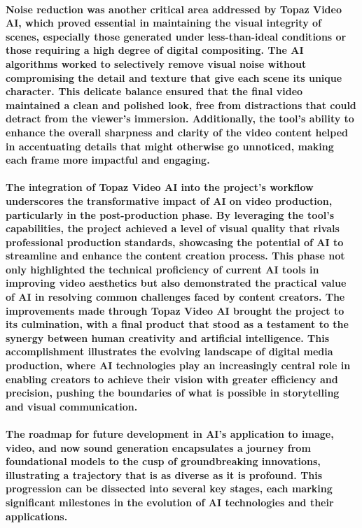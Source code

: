 \documentclass[11pt,a4paper,oneside]{report}
\begin{document}
\paragraph{Noise reduction was another critical area addressed by Topaz Video AI, which proved essential in maintaining the visual integrity of scenes, especially those generated under less-than-ideal conditions or those requiring a high degree of digital compositing. The AI algorithms worked to selectively remove visual noise without compromising the detail and texture that give each scene its unique character. This delicate balance ensured that the final video maintained a clean and polished look, free from distractions that could detract from the viewer's immersion. Additionally, the tool's ability to enhance the overall sharpness and clarity of the video content helped in accentuating details that might otherwise go unnoticed, making each frame more impactful and engaging.}

\paragraph{The integration of Topaz Video AI into the project's workflow underscores the transformative impact of AI on video production, particularly in the post-production phase. By leveraging the tool's capabilities, the project achieved a level of visual quality that rivals professional production standards, showcasing the potential of AI to streamline and enhance the content creation process. This phase not only highlighted the technical proficiency of current AI tools in improving video aesthetics but also demonstrated the practical value of AI in resolving common challenges faced by content creators. The improvements made through Topaz Video AI brought the project to its culmination, with a final product that stood as a testament to the synergy between human creativity and artificial intelligence. This accomplishment illustrates the evolving landscape of digital media production, where AI technologies play an increasingly central role in enabling creators to achieve their vision with greater efficiency and precision, pushing the boundaries of what is possible in storytelling and visual communication.}


\paragraph{The roadmap for future development in AI's application to image, video, and now sound generation encapsulates a journey from foundational models to the cusp of groundbreaking innovations, illustrating a trajectory that is as diverse as it is profound. This progression can be dissected into several key stages, each marking significant milestones in the evolution of AI technologies and their applications.}
\end{document}
